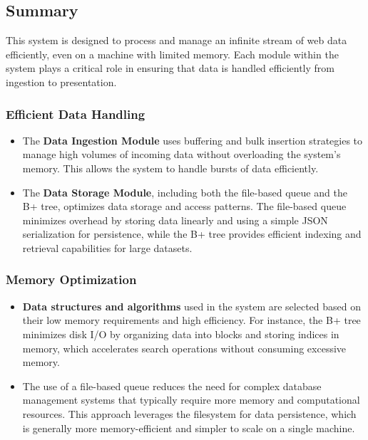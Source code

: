 \subsection{Summary}
This system is designed to process and manage an infinite stream of web data efficiently, even on a machine with limited memory. Each module within the system plays a critical role in ensuring that data is handled efficiently from ingestion to presentation.

\subsubsection{Efficient Data Handling}
\begin{itemize}
    \item The \textbf{Data Ingestion Module} uses buffering and bulk insertion strategies to manage high volumes of incoming data without overloading the system's memory. This allows the system to handle bursts of data efficiently.
    \item The \textbf{Data Storage Module}, including both the file-based queue and the B+ tree, optimizes data storage and access patterns. The file-based queue minimizes overhead by storing data linearly and using a simple JSON serialization for persistence, while the B+ tree provides efficient indexing and retrieval capabilities for large datasets.
\end{itemize}

\subsubsection{Memory Optimization}
\begin{itemize}
    \item \textbf{Data structures and algorithms} used in the system are selected based on their low memory requirements and high efficiency. For instance, the B+ tree minimizes disk I/O by organizing data into blocks and storing indices in memory, which accelerates search operations without consuming excessive memory.
    \item The use of a file-based queue reduces the need for complex database management systems that typically require more memory and computational resources. This approach leverages the filesystem for data persistence, which is generally more memory-efficient and simpler to scale on a single machine.
\end{itemize}